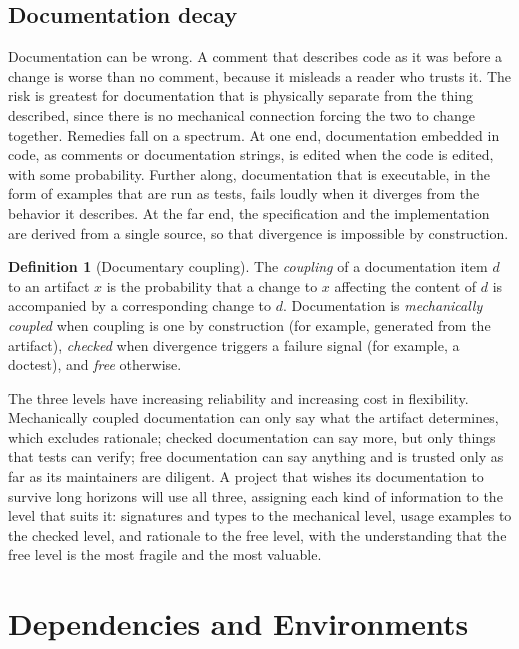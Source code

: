 \documentclass[11pt,twoside,openright]{book}
\theoremstyle{plain}
\theoremstyle{definition}
\newtheorem{definition}[theorem]{Definition}
\theoremstyle{remark}
\begin{document}
\section{Documentation decay}

Documentation can be wrong. A comment that describes code as it was before a change is worse than no comment, because it misleads a reader who trusts it. The risk is greatest for documentation that is physically separate from the thing described, since there is no mechanical connection forcing the two to change together. Remedies fall on a spectrum. At one end, documentation embedded in code, as comments or documentation strings, is edited when the code is edited, with some probability. Further along, documentation that is executable, in the form of examples that are run as tests, fails loudly when it diverges from the behavior it describes. At the far end, the specification and the implementation are derived from a single source, so that divergence is impossible by construction.

\begin{definition}[Documentary coupling]\label{def:coupling}
The \emph{coupling} of a documentation item $d$ to an artifact $x$ is the probability that a change to $x$ affecting the content of $d$ is accompanied by a corresponding change to $d$. Documentation is \emph{mechanically coupled} when coupling is one by construction (for example, generated from the artifact), \emph{checked} when divergence triggers a failure signal (for example, a doctest), and \emph{free} otherwise.
\end{definition}

The three levels have increasing reliability and increasing cost in flexibility. Mechanically coupled documentation can only say what the artifact determines, which excludes rationale; checked documentation can say more, but only things that tests can verify; free documentation can say anything and is trusted only as far as its maintainers are diligent. A project that wishes its documentation to survive long horizons will use all three, assigning each kind of information to the level that suits it: signatures and types to the mechanical level, usage examples to the checked level, and rationale to the free level, with the understanding that the free level is the most fragile and the most valuable.

\chapter{Dependencies and Environments}\label{ch:dependencies}
\end{document}
